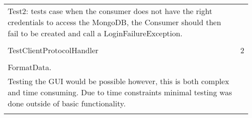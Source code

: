 \documentclass[oneside, english, final]{design}
\begin{document}
\begin{tabular}{|p{}p{}}
  Test2: tests case when the consumer does not have the right credentials to access the MongoDB, the Consumer should then fail to be created and call a LoginFailureException. \\ \\
  TestClientProtocolHandler & 2                                                                                                                                                \\ \\
  FormatData.               &                                                                                                                                                  \\ Testing the GUI would be possible however, this is both complex and time consuming. Due to time constraints minimal testing was done outside of basic functionality.\\ \\
\end{tabular}
\end{document}

